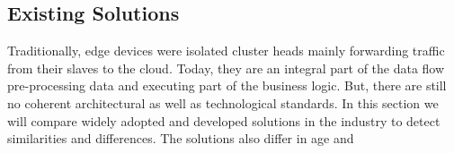 \subsection{Existing Solutions} \label{sec:existingSolutions}

Traditionally, edge devices were isolated cluster heads mainly forwarding traffic from their slaves to the cloud. Today, they are an integral part of the data flow pre-processing data and executing part of the business logic. But, there are still no coherent architectural as well as technological standards. In this section we will compare widely adopted and developed solutions in the industry to detect similarities and differences. The solutions also differ in age and 



